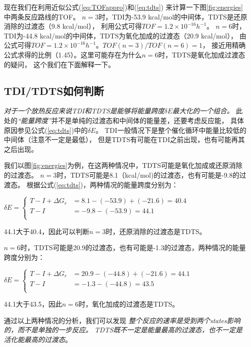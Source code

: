 \documentclass[a4paper,titlepage]{article}
\newcommand*\circled[1]{\tikz[baseline=(char.base)]{
    \node[shape=circle, draw, inner sep=1pt,
        minimum height=12pt] (char) {#1};}}
\begin{document}
现在我们在利用近似公式(\ref{eq:TOFappro})和(\ref{eq:tdts})
来计算一下图\ref{fig:energies}中两条反应路线的TOF。
$n=3$时，TDI为-53.9 kcal/mol的中间体，TDTS是还原消除的过渡态（9.8 kcal/mol），
利用公式可得$TOF=1.2\times{}10^{-16}h^{-1}$。
$n=6$时，TDI为-44.8 kcal/mol的中间体，TDTS为氧化加成的过渡态（20.9 kcal/mol），
由公式可得$TOF=1.2\times{}10^{-16}h^{-1}$。$TOF(n=3)/TOF(n=6) = 1$，
接近用精确公式求得的比例（1.45）。这里可能存在为什么$n=6$时，TDTS是氧化加成过渡态的疑问，
这个我们在下面解释一下。

\subsection*{TDI/TDTS如何判断}
\textit{对于一个放热反应来说TDI和TDTS是能够将能量跨度$\delta{E}$最大化的一个组合。}
此处的\textit{“能量跨度”}并不是单纯的过渡态和中间体的能量差，还要考虑反应能，
具体原因参见公式(\ref{eq:tdts})中的$\delta{E}$。
TDI一般情况下是整个催化循环中能量比较低的中间体（注意不一定是最低），
但是TDTS有可能在TDI之前出现，也有可能再其之后出现。

我们以图\ref{fig:energies}为例，在这两种情况中，TDTS可能是氧化加成或还原消除的过渡态。
$n=3$时，TDTS可能是8.1（kcal/mol)的过渡态，也有可能是-9.8的过渡态。
根据公式(\ref{eq:tdts})，两种情况的能量跨度分别为：
\begin{center}
$\delta{E}=
\begin{cases}
    T - I + \Delta{G_r} & = 8.1 - (-53.9) + (-21.6) = 40.4\\
    T - I  & = -9.8 - (-53.9) = 44.1\\
\end{cases}$
\end{center}
44.1大于40.4，因此可以判断$n=3$时，还原消除的过渡态是TDTS。

$n=6$时，TDTS可能是20.9的过渡态，也有可能是-1.3的过渡态，两种情况的能量跨度分别为：
\begin{center}
$\delta{E}=
\begin{cases}
    T - I + \Delta{G_r} & = 20.9 - (-44.8) + (-21.6) = 44.1\\
    T - I &  = -1.3 - (-44.8) = 43.5\\
\end{cases}$
\end{center}
44.1大于43.5，因此$n=6$时，氧化加成的过渡态是TDTS。

通过以上两种情况的分析，我们可以发现
\circled{1}\textit{整个反应的速率是受到两个states影响的，而不是单独的一步反应。}
\circled{2}\textit{TDTS既不一定是能量最高的过渡态，也不一定是活化能最高的过渡态}。
\end{document}
